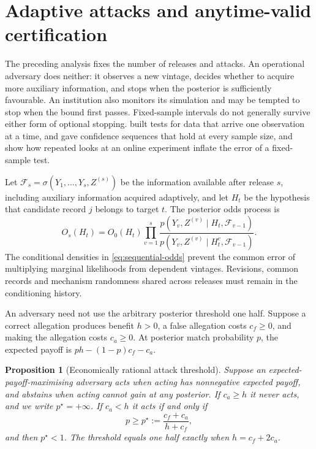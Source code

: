 \documentclass[11pt,a4paper]{article}
\theoremstyle{plain}
\newtheorem{proposition}{Proposition}
\theoremstyle{definition}
\theoremstyle{definition}
\theoremstyle{plain}
\begin{document}
\section{Adaptive attacks and anytime-valid certification}\label{sec:sequential}

The preceding analysis fixes the number of releases and attacks. An operational
adversary does neither: it observes a new vintage, decides whether to acquire more
auxiliary information, and stops when the posterior is sufficiently favourable.
An institution also monitors its simulation and may be tempted to stop when the
bound first passes. Fixed-sample intervals do not generally survive either form
of optional stopping. \citet{wald1945} built tests for data that arrive one
observation at a time, \citet{darling1967} and \citet{lai1976} gave confidence
sequences that hold at every sample size, and \citet{johari2022} show how
repeated looks at an online experiment inflate the error of a fixed-sample
test.

Let $\mathcal F_s=\sigma(Y_1,\ldots,Y_s,Z^{(s)})$ be the information available
after release $s$, including auxiliary information acquired adaptively, and let
$H_t$ be the hypothesis that candidate record $j$ belongs to target $t$. The
posterior odds process is
\begin{equation}
O_s(H_t)=O_0(H_t)\prod_{v=1}^s
\frac{p(Y_v,Z^{(v)}\mid H_t,\mathcal F_{v-1})}
     {p(Y_v,Z^{(v)}\mid H_t^c,\mathcal F_{v-1})}.
\label{eq:sequential-odds}
\end{equation}
The conditional densities in \eqref{eq:sequential-odds} prevent the common error
of multiplying marginal likelihoods from dependent vintages. Revisions, common
records and mechanism randomness shared across releases must remain in the
conditioning history.

An adversary need not use the arbitrary posterior threshold one half. Suppose a
correct allegation produces benefit $h>0$, a false allegation costs $c_f\ge0$,
and making the allegation costs $c_a\ge0$. At posterior match probability $p$,
the expected payoff is $ph-(1-p)c_f-c_a$.

\begin{proposition}[Economically rational attack threshold]
\label{prop:attack-threshold}
Suppose an expected-payoff-maximising adversary acts when acting has
nonnegative expected payoff, and abstains when acting cannot gain at any
posterior. If $c_a\ge h$ it never acts, and we write
$p^\star=+\infty$. If $c_a<h$ it acts if and only if
\begin{equation}
p\ge p^\star:=\frac{c_f+c_a}{h+c_f},
\label{eq:attack-threshold}
\end{equation}
and then $p^\star<1$. The threshold equals one half exactly when $h=c_f+2c_a$.
\end{proposition}
\end{document}
